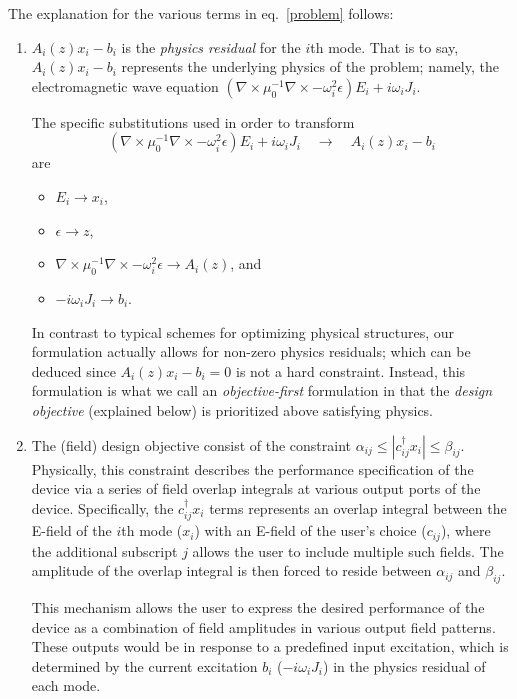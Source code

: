 \documentclass[letterpaper,10pt]{article}
\newcommand{\eq}[1]{eq.~\eqref{#1}}
\newcommand{\BI}{\begin{itemize}\item}
\newcommand{\I}{\item}
\newcommand{\EI}{\end{itemize}}
\newcommand{\BE}{\begin{equation*}}
\newcommand{\EE}{\end{equation*}}
\newcommand{\T}{^\dagger}
\begin{document}
The explanation for the various terms in \eq{problem} follows:
\begin{enumerate}
\item 
    $A_i(z)x_i - b_i$ is the \emph{physics residual} for the $i$th mode.
    That is to say, $A_i(z)x_i - b_i$ represents the underlying physics
        of the problem; namely, the electromagnetic wave equation
        \mbox{$(\nabla\times\mu_0^{-1}\nabla\times - \omega_i^2 \epsilon) E_i 
            +i \omega_i J_i $}.

    The specific substitutions used in order to transform
        \BE (\nabla\times\mu_0^{-1}\nabla\times - \omega_i^2 \epsilon) E_i 
            +i \omega_i J_i  \quad\longrightarrow\quad A_i(z)x_i - b_i \EE
        are
    \BI $E_i \to x_i$,
    \I  $\epsilon \to z$,
    \I  $\nabla\times\mu_0^{-1}\nabla\times - \omega_i^2 \epsilon \to A_i(z)$, and
    \I  $ -i\omega_i J_i \to b_i$.  \EI

    In contrast to typical schemes for optimizing physical structures,
        our formulation actually allows for non-zero physics residuals;
        which can be deduced since $A_i(z)x_i-b_i=0$ is not a hard constraint.
    Instead, this formulation is what we call an \emph{objective-first} \cite{ob1_wg}
        formulation in that the \emph{design objective} (explained below)
        is prioritized above satisfying physics.

\item
    The (field) design objective consist of 
        the constraint $\alpha_{ij} \le |c_{ij}\T x_i| \le \beta_{ij}$.
    Physically, this constraint describes 
        the performance specification of the device 
        via a series of field overlap integrals 
        at various output ports of the device.
    Specifically, the $c_{ij}\T x_i$ terms represents an overlap integral between
        the E-field of the $i$th mode ($x_i$)
        with an E-field of the user's choice ($c_{ij}$),
        where the additional subscript $j$ allows the user
        to include multiple such fields.
    The amplitude of the overlap integral is then forced to reside between
        $\alpha_{ij}$ and $\beta_{ij}$.

    This mechanism allows the user to express 
        the desired performance of the device
        as a combination of field amplitudes in various output field patterns.
    These outputs would be in response to a predefined input excitation,
        which is determined by the current excitation $b_i$ ($-i\omega_i J_i$)
        in the physics residual of each mode.


\end{enumerate}
\end{document}
